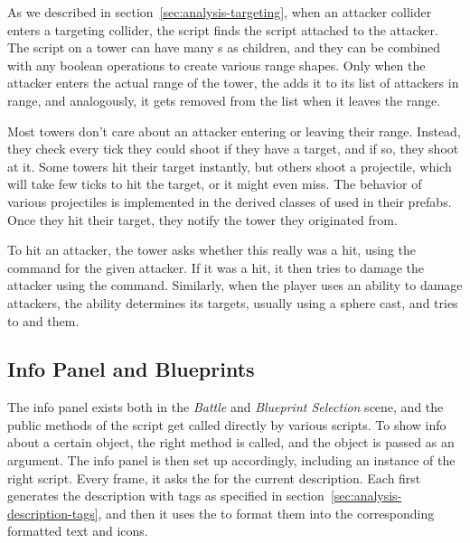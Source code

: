 As we described in section~\ref{sec:analysis-targeting}, when an attacker collider enters a targeting collider, the  script finds the  script attached to the attacker.
The  script on a tower can have many s as children, and they can be combined with any boolean operations to create various range shapes.
Only when the attacker enters the actual range of the tower, the  adds it to its list of attackers in range, and analogously, it gets removed from the list when it leaves the range.

Most towers don't care about an attacker entering or leaving their range.
Instead, they check every tick they could shoot if they have a target, and if so, they shoot at it.
Some towers hit their target instantly, but others shoot a projectile, which will take few ticks to hit the target, or it might even miss.
The behavior of various projectiles is implemented in the derived classes of  used in their prefabs.
Once they hit their target, they notify the tower they originated from.

To hit an attacker, the tower asks whether this really was a hit, using the  command for the given attacker.
If it was a hit, it then tries to damage the attacker using the  command.
Similarly, when the player uses an ability to damage attackers, the ability determines its targets, usually using a sphere cast, and tries to  and  them.

\subsection{Info Panel and Blueprints}

The info panel exists both in the \emph{Battle} and \emph{Blueprint Selection} scene, and the public methods of the  script get called directly by various scripts.
To show info about a certain object, the right method is called, and the object is passed as an argument.
The info panel is then set up accordingly, including an instance of the right  script.
Every frame, it asks the  for the current description.
Each  first generates the description with tags as specified in section~\ref{sec:analysis-description-tags}, and then it uses the  to format them into the corresponding formatted text and icons.

